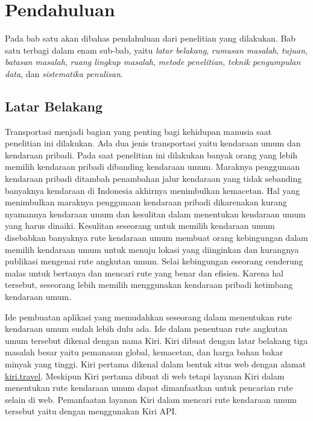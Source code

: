 \chapter{Pendahuluan}
\label{chap:intro}

Pada bab satu akan dibahas pendahuluan dari penelitian yang dilakukan. Bab satu terbagi dalam enam sub-bab, yaitu \textit{latar belakang}, \textit{rumusan masalah}, \textit{tujuan}, \textit{batasan masalah}, \textit{ruang lingkup masalah}, \textit{metode penelitian}, \textit{teknik pengumpulan data}, dan \textit{sistematika penulisan}.

\section{Latar Belakang}
\label{sec:latar_belakang}
\hspace{0.5cm} Transportasi menjadi bagian yang penting bagi kehidupan manusia saat penelitian ini dilakukan. Ada dua jenis transportasi yaitu kendaraan umum dan kendaraan pribadi. Pada saat penelitian ini dilakukan banyak orang yang lebih memilih kendaraan pribadi dibanding kendaraan umum. Maraknya penggunaan kendaraan pribadi ditambah penambahan jalur kendaraan yang tidak sebanding banyaknya kendaraan di Indonesia akhirnya menimbulkan kemacetan. Hal yang menimbulkan maraknya penggunaan kendaraan pribadi dikarenakan kurang nyamannya kendaraan umum dan kesulitan dalam menentukan kendaraan umum yang harus dinaiki. Kesulitan seseorang untuk memilih kendaraan umum disebabkan banyaknya rute kendaraan umum membuat orang kebingungan dalam memilih kendaraan umum untuk menuju lokasi yang diinginkan dan kurangnya publikasi mengenai rute angkutan umum. Selai kebingungan eseorang cenderung malas untuk bertanya dan mencari rute yang benar dan efisien. Karena hal tersebut, seseorang lebih memilih menggunakan kendaraan pribadi ketimbang kendaraan umum. 

Ide pembuatan aplikasi yang memudahkan seseorang dalam menentukan rute kendaraan umum sudah lebih dulu ada. Ide dalam penentuan rute angkutan umum tersebut dikenal dengan nama Kiri. Kiri dibuat dengan latar belakang tiga masalah besar yaitu pemanasan global, kemacetan, dan harga bahan bakar minyak yang tinggi\footnotemark[1]. Kiri pertama dikenal dalam bentuk situs web dengan alamat \url{kiri.travel}. Meskipun Kiri pertama dibuat di web tetapi layanan Kiri dalam menentukan rute kendaraan umum dapat dimanfaatkan untuk pencarian rute selain di web. Pemanfaatan layanan Kiri dalam mencari rute kendaraan umum tersebut yaitu dengan menggunakan Kiri API.

